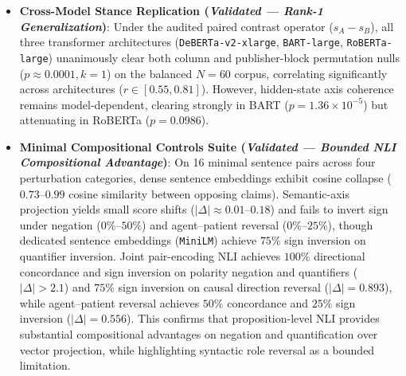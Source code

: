 \begin{itemize}
    \item \textbf{Cross-Model Stance Replication (\emph{Validated --- Rank-1 Generalization})}: Under the audited paired contrast operator ($s_A - s_B$), all three transformer architectures (\texttt{DeBERTa-v2-xlarge}, \texttt{BART-large}, \texttt{RoBERTa-large}) unanimously clear both column and publisher-block permutation nulls ($p \approx 0.0001, k=1$) on the balanced $N=60$ corpus, correlating significantly across architectures ($r \in [0.55, 0.81]$). However, hidden-state axis coherence remains model-dependent, clearing strongly in BART ($p = 1.36 \times 10^{-5}$) but attenuating in RoBERTa ($p = 0.0986$).
    \item \textbf{Minimal Compositional Controls Suite (\emph{Validated --- Bounded NLI Compositional Advantage})}: On 16 minimal sentence pairs across four perturbation categories, dense sentence embeddings exhibit cosine collapse ($0.73$--$0.99$ cosine similarity between opposing claims). Semantic-axis projection yields small score shifts ($|\Delta| \approx 0.01$--$0.18$) and fails to invert sign under negation ($0\%$--$50\%$) and agent--patient reversal ($0\%$--$25\%$), though dedicated sentence embeddings (\texttt{MiniLM}) achieve $75\%$ sign inversion on quantifier inversion. Joint pair-encoding NLI achieves $100\%$ directional concordance and sign inversion on polarity negation and quantifiers ($|\Delta| > 2.1$) and $75\%$ sign inversion on causal direction reversal ($|\Delta| = 0.893$), while agent--patient reversal achieves $50\%$ concordance and $25\%$ sign inversion ($|\Delta| = 0.556$). This confirms that proposition-level NLI provides substantial compositional advantages on negation and quantification over vector projection, while highlighting syntactic role reversal as a bounded limitation.

\end{itemize}

